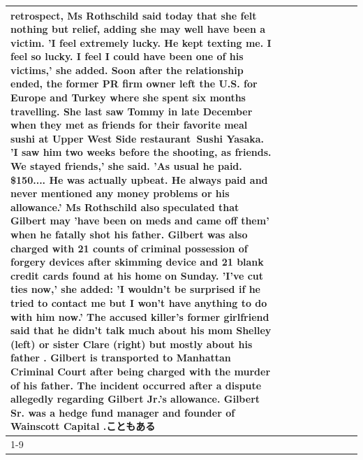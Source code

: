 \begin{table}[H]
\begin{tabular}{lllrlllll}
retrospect, Ms Rothschild said today that she felt nothing but relief, adding she may well have been a victim. 'I feel extremely lucky. He kept texting me. I feel so lucky. I feel I could have been one of his victims,' she added. Soon after the relationship ended, the former PR firm owner left the U.S. for Europe and Turkey where she spent six months  travelling. She last saw Tommy in late December when they met as friends for their favorite meal sushi at Upper West Side restaurant Sushi Yasaka. 'I saw him two weeks before the shooting, as friends. We stayed friends,' she said. 'As usual he paid. \$150.... He was actually upbeat. He always paid and never mentioned any money problems or his allowance.' Ms Rothschild also speculated that Gilbert may 'have been on meds and came off them' when he fatally shot his father. Gilbert was also charged with 21 counts of criminal possession of forgery devices after skimming device and 21 blank credit cards found at his home on Sunday. 'I've cut ties now,' she added: 'I wouldn’t be surprised if he tried to contact me but I won’t have anything to do with him now.' The accused killer's former girlfriend said that he didn't talk much about his mom Shelley (left) or sister Clare (right) but mostly about his father . Gilbert is transported to Manhattan Criminal Court  after being charged with the murder of his father. The incident occurred after a dispute allegedly regarding Gilbert Jr.'s allowance. Gilbert Sr. was a hedge fund manager and founder of Wainscott Capital .こともある \\
\cline{1-9}

\end{tabular}
\end{table}
